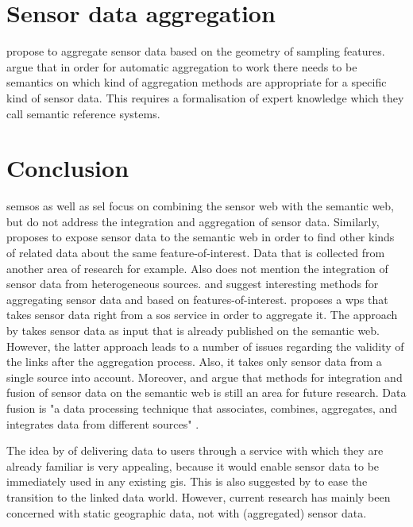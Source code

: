 \section{Sensor data aggregation}
\cite{SSW:Stasch} propose to aggregate sensor data based on the geometry of sampling features. \cite{SSW:Stasch4} argue that in order for automatic aggregation to work there needs to be semantics on which kind of aggregation methods are appropriate for a specific kind of sensor data. This requires a formalisation of expert knowledge which they call semantic reference systems.

\section{Conclusion}
\ac{semsos} \citep{SSW:Henson, SSW:Pschorr} as well as \ac{sel} \citep{SSW:Janowicz} focus on combining the sensor web with the semantic web, but do not address the integration and aggregation of sensor data. Similarly, \cite{SSW:Atkinson} proposes to expose sensor data to the semantic web in order to find other kinds of related data about the same feature-of-interest. Data that is collected from another area of research for example. Also \cite{SSW:Atkinson} does not mention the integration of sensor data from heterogeneous sources. \cite{SSW:Stasch} and \cite{SSW:Stasch3} suggest interesting methods for aggregating sensor data and based on features-of-interest. \cite{SSW:Stasch3} proposes a \ac{wps} that takes sensor data right from a \ac{sos} service in order to aggregate it. The approach by \cite{SSW:Stasch} takes sensor data as input that is already published on the semantic web. However, the latter approach leads to a number of issues regarding the validity of the links after the aggregation process. Also, it takes only sensor data from a single source into account. Moreover, \cite{SSW:Corcho} and \cite{SSW:Ji} argue that methods for integration and fusion of sensor data on the semantic web is still an area for future research. Data fusion is "a data processing technique that associates, combines, aggregates, and integrates data from different sources" \cite[p. 2]{SSW:Perera}.  

The idea by \cite{SW:Jones} of delivering data to users through a service with which they are already familiar is very appealing, because it would enable sensor data to be immediately used in any existing \ac{gis}. This is also suggested by \cite{SSW:Atkinson} to ease the transition to the linked data world. However, current research has mainly been concerned with static geographic data, not with (aggregated) sensor data. \\

